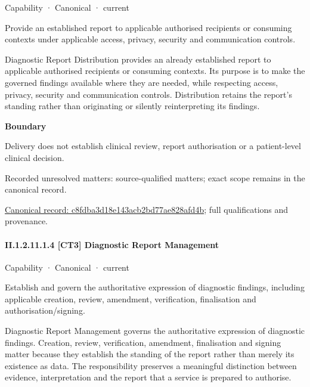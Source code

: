 \label{element:c8fdba3d18e143acb2bd77ae828afd4b}
{\small Capability · Canonical · current}\par

Provide an established report to applicable authorised recipients or consuming contexts under applicable access, privacy, security and communication controls.



Diagnostic Report Distribution provides an already established report to applicable authorised recipients or consuming contexts. Its purpose is to make the governed findings available where they are needed, while respecting access, privacy, security and communication controls. Distribution retains the report's standing rather than originating or silently reinterpreting its findings.



\textbf{Boundary}



Delivery does not establish clinical review, report authorisation or a patient-level clinical decision.


{\small Recorded unresolved matters: source-qualified matters; exact scope remains in the canonical record.}\par
{\footnotesize \href{../../../../continuum/strategy/capability/c8fdba3d18e143acb2bd77ae828afd4b.md}{Canonical record: c8fdba3d18e143acb2bd77ae828afd4b}; full qualifications and provenance.}\par
\paragraph*{II.1.2.11.1.4 [CT3] Diagnostic Report Management}
\label{navigation:II.1.2.11.1.4}

\label{element:977ed170c34445ddb5095945f54f6907}
{\small Capability · Canonical · current}\par

Establish and govern the authoritative expression of diagnostic findings, including applicable creation, review, amendment, verification, finalisation and authorisation/signing.



Diagnostic Report Management governs the authoritative expression of diagnostic findings. Creation, review, verification, amendment, finalisation and signing matter because they establish the standing of the report rather than merely its existence as data. The responsibility preserves a meaningful distinction between evidence, interpretation and the report that a service is prepared to authorise.



